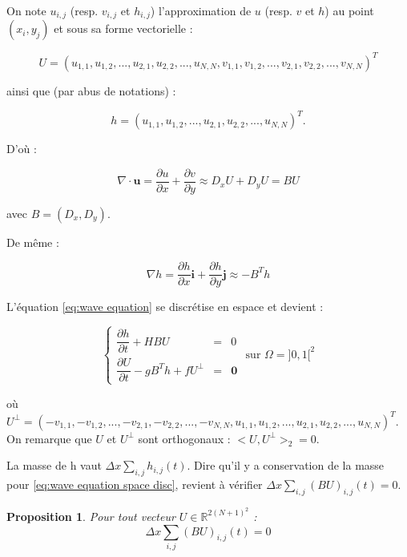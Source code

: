 \documentclass[10pt,a4paper]{article}
\newtheorem{proposition}{Proposition}
\begin{document}
On note $u_{i,j}$ (resp. $v_{i,j}$ et $h_{i,j}$) l'approximation de $u$ (resp. $v$ et $h$) au point $(x_i,y_j)$ et sous sa forme vectorielle :

$$U=\left( u_{1,1},u_{1,2},...,u_{2,1},u_{2,2},...,u_{N,N},v_{1,1},v_{1,2},...,v_{2,1},v_{2,2},...,v_{N,N} \right)^T$$

ainsi que (par abus de notations) :

$$h = \left( u_{1,1},u_{1,2},...,u_{2,1},u_{2,2},...,u_{N,N}\right)^T.$$

D'où :

$$\nabla \cdot \mathbf{u} = \dfrac{\partial u}{\partial x} + \dfrac{\partial v}{\partial y} \approx D_x U + D_y U = B U$$

avec $B=\left( D_x, D_y \right)$.

De même :

$$\nabla h = \dfrac{\partial h}{\partial x} \mathbf{i} + \dfrac{\partial h}{\partial y} \mathbf{j} \approx - B^T h$$

L'équation \eqref{eq:wave equation} se discrétise en espace et devient :

\begin{equation}
\left\lbrace
\begin{array}{rcl}
\dfrac{\partial h}{\partial t} + H B U & = & 0 \\
\dfrac{\partial U}{\partial t} - g B^T h + f  U^{\perp} & = & \mathbf{0} 
\end{array}
\right. \text{ sur } \Omega = ]0,1[^2
\label{eq:wave equation space disc}
\end{equation}

où $U^{\perp} = \left( -v_{1,1},-v_{1,2},...,-v_{2,1},-v_{2,2},...,-v_{N,N},u_{1,1},u_{1,2},...,u_{2,1},u_{2,2},...,u_{N,N} \right)^T$. On remarque que $U$ et $U^{\perp}$ sont orthogonaux : $<U, U^{\perp}>_2 = 0$.

La masse de h vaut $\Delta x \sum_{i,j} h_{i,j}(t)$. Dire qu'il y a conservation de la masse pour \eqref{eq:wave equation space disc}, revient à vérifier $\Delta x \sum_{i,j} (BU)_{i,j}(t)=0$.

\begin{proposition}
Pour tout vecteur $U \in \mathbb{R}^{2 (N+1)^2}$ :
\begin{equation}
\Delta x \sum_{i,j} (BU)_{i,j}(t)=0
\label{eq:conservation disc}
\end{equation}
\end{proposition}
\end{document}
